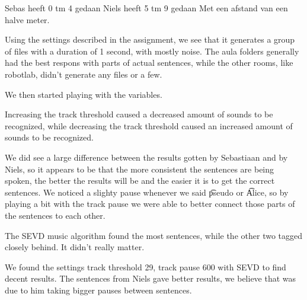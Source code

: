 
Sebas heeft 0 tm 4 gedaan
Niels heeft 5 tm 9 gedaan
Met een afstand van een halve meter.

Using the settings described in the assignment, we see that it generates a group of files with a duration of 1 second, with mostly noise. The aula folders generally had the best respons with parts of actual sentences, while the other rooms, like robotlab, didn't generate any files or a few.

We then started playing with the variables.

Increasing the track threshold caused a decreased amount of sounds to be recognized, while decreasing the track threshold caused an increased amount of sounds to be recognized. 

We did see a large difference between the results gotten by Sebastiaan and by Niels, so it appears to be that the more consistent the sentences are being spoken, the better the results will be and the easier it is to get the correct sentences. We noticed a slighty pause whenever we said \t{pseudo} or \t{Alice}, so by playing a bit with the track pause we were able to better connect those parts of the sentences to each other.

The SEVD music algorithm found the most sentences, while the other two tagged closely behind. It didn't really matter.

We found the settings track threshold 29, track pause 600 with SEVD to find decent results. The sentences from Niels gave better results, we believe that was due to him taking bigger pauses between sentences.